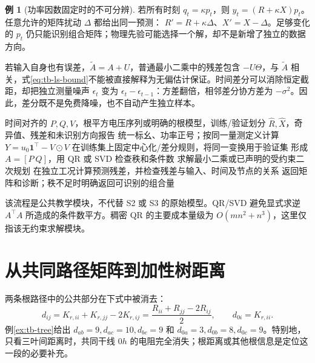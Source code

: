 \documentclass[UTF8,11pt,fontset=fandol,openany,oneside]{ctexbook}
\theoremstyle{definition}
\newtheorem{example}[theorem]{例}
\theoremstyle{remark}
\numberwithin{equation}{chapter}
\begin{document}
\begin{example}[功率因数固定时的不可分辨]
若所有时刻 $q_t=\kappa p_t$，则 $y_t=(R+\kappa X)p_t$。任意允许的矩阵扰动 $\Delta$ 都给出同一预测：
$R'=R+\kappa\Delta$、$X'=X-\Delta$。足够变化的 $p_t$ 仍只能识别组合矩阵；物理先验可能选择一个解，却不是新增了独立的数据方向。
\end{example}

若输入自身也有误差，$\widetilde A=A+U$，普通最小二乘中的残差包含 $-U\Theta$，与 $\widetilde A$ 相关，式\eqref{eq:tb-ls-bound}不能被直接解释为无偏估计保证。时间差分可以消除恒定截距，却把独立测量噪声 $\epsilon_t$ 变为 $\epsilon_t-\epsilon_{t-1}$：方差翻倍，相邻差分协方差为 $-\sigma^2$。因此，差分既不是免费降噪，也不自动产生独立样本。

\begin{algorithm}[htbp]
\caption{教学模块：从 P/Q/V 数据到可审查的灵敏度估计}
\begin{algorithmic}[1]
\Require 时间对齐的 $P,Q,V$，根平方电压序列或明确的根模型，训练/验证划分
\Ensure $\widehat R,\widehat X$，奇异值、残差和未识别方向报告
\State 统一标幺、功率正号；按同一量测定义计算 $Y=u_0\mathbf1^\top-V\odot V$
\State 在训练集上固定中心化/差分规则，将同一变换用于验证集
\State 形成 $A=[P\ Q]$，用 QR 或 SVD 检查秩和条件数
\State 求解最小二乘或已声明的受约束二次规划
\State 在独立工况计算预测残差，并检查残差与输入、时间及节点的关系
\State 返回矩阵和诊断；秩不足时明确返回可识别的组合量
\end{algorithmic}
\end{algorithm}
该流程是公共教学模块，不代替 S2 或 S3 的原始模型。QR/SVD 避免显式求逆 $A^\top A$ 所造成的条件数平方。稠密 QR 的主要成本量级为 $O(mn^2+n^3)$，这里仅指该无约束求解模块。

\section{从共同路径矩阵到加性树距离}
两条根路径中的公共部分在下式中被消去：
\begin{equation}
 d_{ij}=K_{r,ii}+K_{r,jj}-2K_{r,ij}
       =\frac{R_{ii}+R_{jj}-2R_{ij}}2,
 \qquad d_{0i}=K_{r,ii}.\label{eq:tb-distance}
\end{equation}
例\ref{ex:tb-tree}给出 $d_{ab}=9,d_{ac}=10,d_{bc}=9$ 和 $d_{0a}=3,d_{0b}=8,d_{0c}=9$。特别地，只看三叶间距离时，共同干线 $0h$ 的电阻完全消失；根距离或其他根信息是定位这一段的必要补充。
\end{document}
